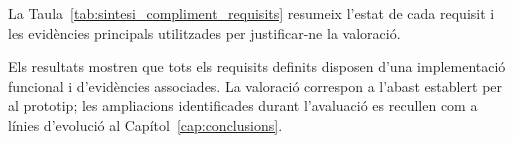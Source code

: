 La Taula~\ref{tab:sintesi_compliment_requisits} resumeix l’estat de cada requisit i les evidències principals utilitzades per justificar-ne la valoració.

Els resultats mostren que tots els requisits definits disposen d'una implementació funcional i d'evidències associades. La valoració correspon a l'abast establert per al prototip; les ampliacions identificades durant l'avaluació es recullen com a línies d'evolució al Capítol~\ref{cap:conclusions}.
